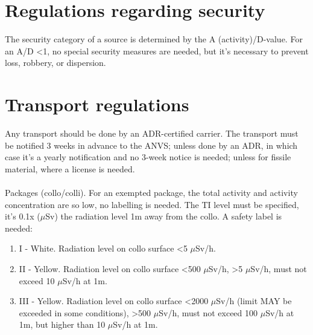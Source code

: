 \section{Regulations regarding security}
The security category of a source is determined by the A (activity)/D-value. For an A/D <1, no special security measures are needed, but it's necessary to prevent loss, robbery, or dispersion. 
\section{Transport regulations}
Any transport should be done by an ADR-certified carrier. The transport must be notified 3 weeks in advance to the ANVS; unless done by an ADR, in which case it's a yearly notification and no 3-week notice is needed; unless for fissile material, where a license is needed. \\\\
Packages (collo/colli). For an exempted package, the total activity and activity concentration are so low, no labelling is needed. The TI level must be specified, it's 0.1x ($\mu$Sv) the radiation level 1m away from the collo. A safety label is needed:\\
\begin{enumerate}
\item I - White. Radiation level on collo surface <5 $\mu$Sv/h.
\item II - Yellow. Radiation level on collo surface <500 $\mu$Sv/h, >5 $\mu$Sv/h, must not exceed 10 $\mu$Sv/h at 1m.
\item III - Yellow. Radiation level on collo surface <2000 $\mu$Sv/h (limit MAY be exceeded in some conditions), >500 $\mu$Sv/h, must not exceed 100 $\mu$Sv/h at 1m, but higher than 10 $\mu$Sv/h at 1m.
\end{enumerate}
